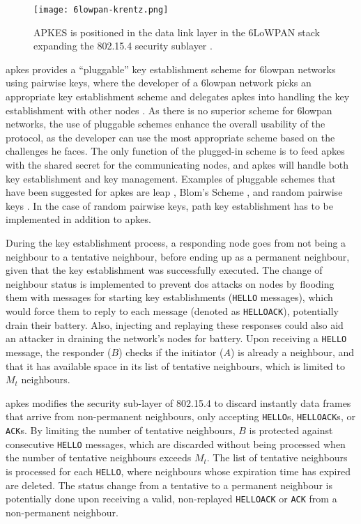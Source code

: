 \begin{figure}
	\centering
	\texttt{[image: 6lowpan-krentz.png]}
	\caption{APKES is positioned in the data link layer in the 6LoWPAN stack expanding the 802.15.4 security sublayer \cite{krentz20136lowpan}.}
	\label{fig:6lowpan-krentz}
\end{figure}

\gls{apkes} provides a ``pluggable'' key establishment scheme for \gls{6lowpan} networks using pairwise keys, where the developer of a \gls{6lowpan} network picks an appropriate key establishment scheme and delegates \gls{apkes} into handling the key establishment with other nodes \cite{krentz20136lowpan}. As there is no superior scheme for \gls{6lowpan} networks, the use of pluggable schemes enhance the overall usability of the protocol, as the developer can use the most appropriate scheme based on the challenges he faces. The only function of the plugged-in scheme is to feed \gls{apkes} with the shared secret for the communicating nodes, and \gls{apkes} will handle both key establishment and key management. Examples of pluggable schemes that have been suggested for \gls{apkes} are \gls{leap} \cite{zhu2006leap+}, Blom's Scheme \cite{blom1984optimal}, and random pairwise keys \cite{chan2003random}. In the case of random pairwise keys, path key establishment has to be implemented in addition to \gls{apkes}.

During the key establishment process, a responding node goes from not being a neighbour to a tentative neighbour, before ending up as a permanent neighbour, given that the key establishment was successfully executed. The change of neighbour status is implemented to prevent \gls{dos} attacks on nodes by flooding them with messages for starting key establishments (\texttt{HELLO} messages), which would force them to reply to each message (denoted as \texttt{HELLOACK}), potentially drain their battery. Also, injecting and replaying these responses could also aid an attacker in draining the network's nodes for battery. Upon receiving a \texttt{HELLO} message, the responder ($B$) checks if the initiator ($A$) is already a neighbour, and that it has available space in its list of tentative neighbours, which is limited to $M_t$ neighbours. 

\gls{apkes} modifies the security sub-layer of 802.15.4 to discard instantly data frames that arrive from non-permanent neighbours, only accepting \texttt{HELLO}s, \texttt{HELLOACK}s, or \texttt{ACK}s. By limiting the number of tentative neighbours, $B$ is protected against consecutive \texttt{HELLO} messages, which are discarded without being processed when the number of tentative neighbours exceeds $M_t$. The list of tentative neighbours is processed for each \texttt{HELLO}, where neighbours whose expiration time has expired are deleted. The status change from a tentative to a permanent neighbour is potentially done upon receiving a valid, non-replayed \texttt{HELLOACK} or \texttt{ACK} from a non-permanent neighbour.

